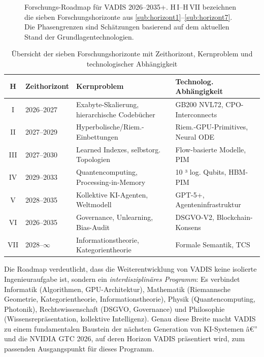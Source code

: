 ﻿\documentclass[12pt,a4paper]{article}
\begin{document}
\begin{figure}[ht]
\caption{Forschungs-Roadmap für VADIS 2026--2035+.
         H\,I--H\,VII bezeichnen die sieben Forschungshorizonte
         aus \cref{sub:horizont1}--\cref{sub:horizont7}.
         Die Phasengrenzen sind Schätzungen basierend auf
         dem aktuellen Stand der Grundlagentechnologien.}
\label{fig:roadmap}
\end{figure}

\begin{table}[ht]
\centering
\small
\caption{Übersicht der sieben Forschungshorizonte mit
         Zeithorizont, Kernproblem und technologischer
         Abhängigkeit}
\label{tab:horizonte}
\begin{tabular}{@{}clp{3.5cm}p{3.5cm}@{}}
\toprule
\textbf{H} & \textbf{Zeithorizont} & \textbf{Kernproblem} &
\textbf{Technolog. Abhängigkeit} \\
\midrule
I   & 2026--2027 & Exabyte-Skalierung, hierarchische Codebücher &
                   GB200 NVL72, CPO-Interconnects \\
II  & 2027--2029 & Hyperbolische/Riem.-Einbettungen &
                   Riem.-GPU-Primitives, Neural ODE \\
III & 2027--2030 & Learned Indexes, selbstorg. Topologien &
                   Flow-basierte Modelle, PIM \\
IV  & 2029--2033 & Quantencomputing, Processing-in-Memory &
                   10 ³ log. Qubits, HBM-PIM \\
V   & 2028--2035 & Kollektive KI-Agenten, Weltmodell &
                   GPT-5+, Agenteninfrastruktur \\
VI  & 2026--2035 & Governance, Unlearning, Bias-Audit &
                   DSGVO-V2, Blockchain-Konsens \\
VII & 2028--$\infty$ & Informationstheorie, Kategorientheorie &
                   Formale Semantik, TCS \\
\bottomrule
\end{tabular}
\end{table}

Die Roadmap verdeutlicht, dass die Weiterentwicklung von
VADIS keine isolierte Ingenieuraufgabe ist, sondern ein
\emph{interdisziplinäres Programm}: Es verbindet
Informatik (Algorithmen, GPU-Architektur),
Mathematik (Riemannsche Geometrie, Kategorientheorie,
Informationstheorie), Physik (Quantencomputing, Photonik),
Rechtswissenschaft (DSGVO, Governance) und
Philosophie (Wissensrepräsentation, kollektive Intelligenz).
Genau diese Breite macht VADIS zu einem
fundamentalen Baustein der nächsten Generation von KI-Systemen â€”
und die NVIDIA GTC 2026, auf deren Horizon VADIS präsentiert wird,
zum passenden Ausgangspunkt für dieses Programm.
\end{document}
